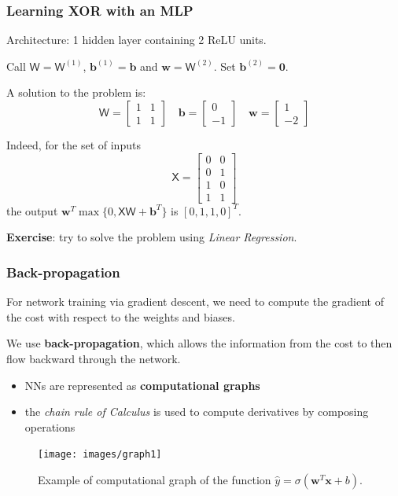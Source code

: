 \documentclass{beamer}
\begin{document}
	\begin{frame}
		\frametitle{Learning XOR with an MLP}
		Architecture: 1 hidden layer containing 2 ReLU units.
		
		\vspace{5mm}
		
		Call $\mathsf{W} = \mathsf{W}^{(1)}$, $\bm{b}^{(1)} = \bm{b}$ and $\bm{w} =  \mathsf{W}^{(2)}$. Set $\bm{b}^{(2)} = \bm{0}$.
		
		\vspace{5mm}
		
		A solution to the problem is:
		$$\mathsf{W} = \begin{bmatrix}
			 1 & 1\\
			 1 & 1
		\end{bmatrix} \quad 
		\bm{b} = \begin{bmatrix}
		0 \\
		-1
		\end{bmatrix} \quad 
		\bm{w} = \begin{bmatrix}
			1 \\
			-2
		\end{bmatrix}
		$$
		
		Indeed, for the set of inputs
		$$\mathsf{X} = \begin{bmatrix}
			0 & 0\\
			0 & 1 \\
			1 & 0 \\
			1 & 1
			\end{bmatrix}
		$$
		the output $\bm{w}^T \max \{0, \mathsf{XW} + \bm{b}^T\}$ is $[0, 1, 1, 0]^T$.
		
		\vspace{5mm}
		
		\textbf{Exercise}: try to solve the problem using \textit{Linear Regression}.
		
	\end{frame}



	

	\begin{frame}
		\frametitle{Back-propagation}
		For network training via gradient descent, we need to compute the gradient of the cost with respect to the weights and biases.
		
		We use \textbf{back-propagation}, which allows the information from the cost to then ﬂow backward through the network.
		
		\begin{itemize}
			\item NNs are represented as \textbf{computational graphs}
			\item the \textit{chain rule of Calculus} is used to compute derivatives by composing operations
		\end{itemize}
		
		\begin{figure}
			\centering
			\texttt{[image: images/graph1]}
			\caption{Example of computational graph of the function $\hat{y} = \sigma(\bm{w}^T\bm{x}+b)$.}
		\end{figure}
	\end{frame}
\end{document}
